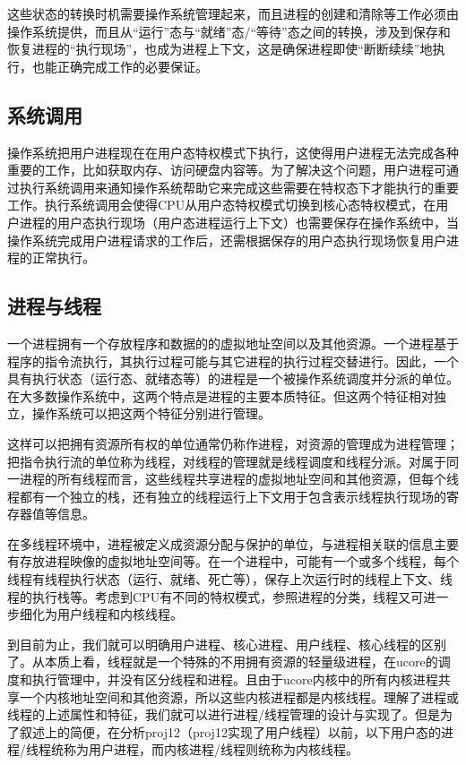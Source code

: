 这些状态的转换时机需要操作系统管理起来，而且进程的创建和清除等工作必须由操作系统提供，而且从``运行''态与``就绪''态/``等待''态之间的转换，涉及到保存和恢复进程的``执行现场''，也成为进程上下文，这是确保进程即使``断断续续''地执行，也能正确完成工作的必要保证。

\subsection{系统调用}\label{ux7cfbux7edfux8c03ux7528}

操作系统把用户进程现在在用户态特权模式下执行，这使得用户进程无法完成各种重要的工作，比如获取内存、访问硬盘内容等。为了解决这个问题，用户进程可通过执行系统调用来通知操作系统帮助它来完成这些需要在特权态下才能执行的重要工作。执行系统调用会使得CPU从用户态特权模式切换到核心态特权模式，在用户进程的用户态执行现场（用户态进程运行上下文）也需要保存在操作系统中，当操作系统完成用户进程请求的工作后，还需根据保存的用户态执行现场恢复用户进程的正常执行。

\subsection{进程与线程}\label{ux8fdbux7a0bux4e0eux7ebfux7a0b}

一个进程拥有一个存放程序和数据的的虚拟地址空间以及其他资源。一个进程基于程序的指令流执行，其执行过程可能与其它进程的执行过程交替进行。因此，一个具有执行状态（运行态、就绪态等）的进程是一个被操作系统调度并分派的单位。在大多数操作系统中，这两个特点是进程的主要本质特征。但这两个特征相对独立，操作系统可以把这两个特征分别进行管理。

这样可以把拥有资源所有权的单位通常仍称作进程，对资源的管理成为进程管理；把指令执行流的单位称为线程，对线程的管理就是线程调度和线程分派。对属于同一进程的所有线程而言，这些线程共享进程的虚拟地址空间和其他资源，但每个线程都有一个独立的栈，还有独立的线程运行上下文用于包含表示线程执行现场的寄存器值等信息。

在多线程环境中，进程被定义成资源分配与保护的单位，与进程相关联的信息主要有存放进程映像的虚拟地址空间等。在一个进程中，可能有一个或多个线程，每个线程有线程执行状态（运行、就绪、死亡等），保存上次运行时的线程上下文、线程的执行栈等。考虑到CPU有不同的特权模式，参照进程的分类，线程又可进一步细化为用户线程和内核线程。

到目前为止，我们就可以明确用户进程、核心进程、用户线程、核心线程的区别了。从本质上看，线程就是一个特殊的不用拥有资源的轻量级进程，在ucore的调度和执行管理中，并没有区分线程和进程。且由于ucore内核中的所有内核进程共享一个内核地址空间和其他资源，所以这些内核进程都是内核线程。理解了进程或线程的上述属性和特征，我们就可以进行进程/线程管理的设计与实现了。但是为了叙述上的简便，在分析proj12（proj12实现了用户线程）以前，以下用户态的进程/线程统称为用户进程，而内核进程/线程则统称为内核线程。
